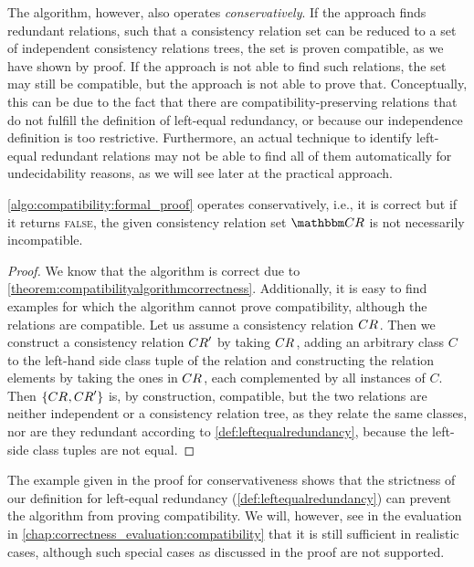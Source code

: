 The algorithm, however, also operates \emph{conservatively}.
If the approach finds redundant relations, such that a consistency relation set can be reduced to a set of independent consistency relations trees, the set is proven compatible, as we have shown by proof.
If the approach is not able to find such relations, the set may still be compatible, but the approach is not able to prove that.
Conceptually, this can be due to the fact that there are compatibility-preserving relations that do not fulfill the definition of left-equal redundancy, or because our independence definition is too restrictive.
Furthermore, an actual technique to identify left-equal redundant relations may not be able to find all of them automatically for undecidability reasons, as we will see later at the practical approach.

\begin{theorem}
    \autoref{algo:compatibility:formal_proof} operates conservatively, i.e., it is correct but if it returns \textsc{false}, the given consistency relation set $\consistencyrelationset{CR}$ is not necessarily incompatible.
\end{theorem}
%
\begin{proof}
    We know that the algorithm is correct due to \autoref{theorem:compatibilityalgorithmcorrectness}.
    Additionally, it is easy to find examples for which the algorithm cannot prove compatibility, although the relations are compatible.
    Let us assume a consistency relation $\consistencyrelation{CR}{}$. 
    Then we construct a consistency relation $\consistencyrelation{CR}{}'$ by taking $\consistencyrelation{CR}{}$, adding an arbitrary class $C$ to the left-hand side class tuple of the relation and constructing the relation elements by taking the ones in $\consistencyrelation{CR}{}$, each complemented by all instances of $C$.
    Then $\setted{\consistencyrelation{CR}{},\consistencyrelation{CR}{}'}$ is, by construction, compatible, but the two relations are neither independent or a consistency relation tree, as they relate the same classes, nor are they redundant according to \autoref{def:leftequalredundancy}, because the left-side class tuples are not equal.
\end{proof}

The example given in the proof for conservativeness shows that the strictness of our definition for left-equal redundancy (\autoref{def:leftequalredundancy}) can prevent the algorithm from proving compatibility.
We will, however, see in the evaluation in \autoref{chap:correctness_evaluation:compatibility} that it is still sufficient in realistic cases, although such special cases as discussed in the proof are not supported.

